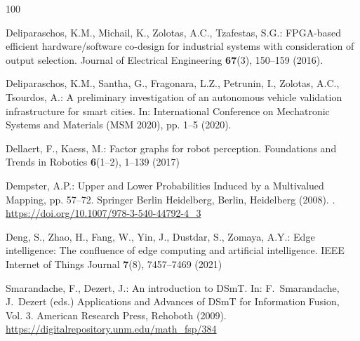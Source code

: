 \documentclass[graybox,envcountchap]{style/SNmono}
\begin{document}
\begin{thebibliography}{100}

Deliparaschos, K.M., Michail, K., Zolotas, A.C., Tzafestas, S.G.: {FPGA}-based
  efficient hardware/software co-design for industrial systems with
  consideration of output selection.
\newblock Journal of Electrical Engineering \textbf{67}(3), 150--159 (2016).
\newblock {}



Deliparaschos, K.M., Santha, G., Fragonara, L.Z., Petrunin, I., Zolotas, A.C.,
  Tsourdos, A.: A preliminary investigation of an autonomous vehicle validation
  infrastructure for smart cities.
\newblock In: International Conference on Mechatronic Systems and Materials
  (MSM 2020), pp. 1--5 (2020).
\newblock {}


{\color{red} 
Dellaert, F., Kaess, M.: Factor graphs for robot perception.
\newblock Foundations and Trends in Robotics \textbf{6}(1--2), 1--139 (2017)

\par}

Dempster, A.P.: Upper and Lower Probabilities Induced by a Multivalued Mapping,
  pp. 57--72.
\newblock Springer Berlin Heidelberg, Berlin, Heidelberg (2008).
\newblock {}.
\newblock \urlprefix\url{https://doi.org/10.1007/978-3-540-44792-4_3}


{\color{red} 
Deng, S., Zhao, H., Fang, W., Yin, J., Dustdar, S., Zomaya, A.Y.: Edge
  intelligence: The confluence of edge computing and artificial intelligence.
\newblock IEEE Internet of Things Journal \textbf{7}(8), 7457--7469 (2021)

\par}
{\color{red} 
Smarandache, F., Dezert, J.: An introduction to {DSmT}.
\newblock In: F.~Smarandache, J.~Dezert (eds.) Applications and Advances of
  {DSmT} for Information Fusion, Vol. 3. American Research Press, Rehoboth
  (2009).
\newblock \urlprefix\url{https://digitalrepository.unm.edu/math\_fsp/384}

}
\end{thebibliography}
\end{document}
